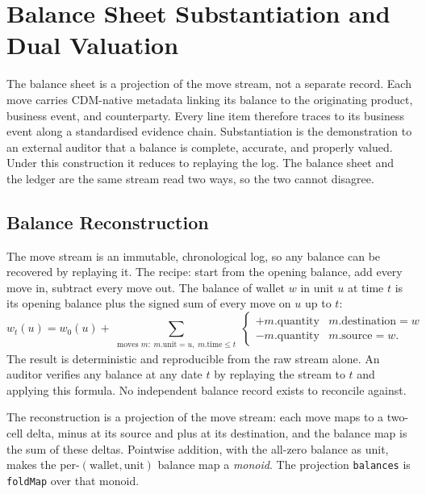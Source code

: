 \section{Balance Sheet Substantiation and Dual Valuation}
\label{sec:substantiation}

The balance sheet is a projection of the move stream, not a separate record. Each move carries CDM-native metadata linking its balance to the originating product, business event, and counterparty. Every line item therefore traces to its business event along a standardised evidence chain. Substantiation is the demonstration to an external auditor that a balance is complete, accurate, and properly valued. Under this construction it reduces to replaying the log. The balance sheet and the ledger are the same stream read two ways, so the two cannot disagree.

\subsection{Balance Reconstruction}

The move stream is an immutable, chronological log, so any balance can be recovered by replaying it. The recipe: start from the opening balance, add every move in, subtract every move out. The balance of wallet $w$ in unit $u$ at time $t$ is its opening balance plus the signed sum of every move on $u$ up to $t$:
\[
w_t(u) = w_0(u) + \sum_{\substack{\text{moves } m:\; m.\text{unit}=u,\; m.\text{time}\leq t}}
\begin{cases}
+m.\text{quantity} & m.\text{destination}=w \\
-m.\text{quantity} & m.\text{source}=w.
\end{cases}
\]
The result is deterministic and reproducible from the raw stream alone. An auditor verifies any balance at any date $t$ by replaying the stream to $t$ and applying this formula. No independent balance record exists to reconcile against.

The reconstruction is a projection of the move stream: each move maps to a two-cell delta, minus at its source and plus at its destination, and the balance map is the sum of these deltas. Pointwise addition, with the all-zero balance as unit, makes the per-$(\text{wallet},\text{unit})$ balance map a \emph{monoid}. The projection \lstinline!balances! is \lstinline!foldMap! over that monoid.

